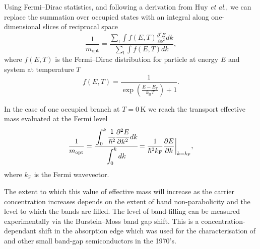 Using Fermi--Dirac statistics, and following a derivation from Huy \textit{et al.},\autocite{Huy2011} we can replace the summation over occupied states with an integral along one-dimensional slices of reciprocal space
\begin{equation} \label{opt2}
\frac{1}{m_{\text{opt}}} = \frac{\displaystyle\sum_{\text{l}} \displaystyle\int f(E,T) \frac{\partial^2 E}{\partial k^2} dk}{\displaystyle\sum_{\text{l}} \displaystyle\int f(E,T) dk},
\end{equation}
where $f(E,T)$ is the Fermi--Dirac distribution for particle at energy $E$ and system at temperature $T$
\begin{equation} \label{fermidirac}
f(E,T) = \frac{1}{\exp\left(\frac{E-E_{\text{F}}}{k_{\text{B}}T}\right)+1}.
\end{equation}

In the case of one occupied branch at $T=0\,\mathrm{K}$ we reach the transport effective mass evaluated at the Fermi level
\begin{equation} \label{opt}   
\frac{1}{m_{\text{opt}}} = \cfrac{\displaystyle\int_0^{k} \cfrac{1}{\hbar^2}\frac{\partial^2E}{\partial k^2} dk}{\displaystyle\int_0^{k}dk} = \frac{1}{\hbar^2k_{\text{F}}} \frac{\partial E}{\partial k}\biggr\rvert_{k=k_{\text{F}}},
\end{equation}
where $k_{\text{F}}$ is the Fermi wavevector.

The extent to which this value of effective mass will increase as the carrier concentration increases depends on the extent of band non-parabolicity and the level to which the bands are filled. 
The level of band-filling can be measured experimentally via the Burstein--Moss band gap shift.\autocite{Burstein1954,Moss1954} 
This is a concentration-dependant shift in the absorption edge which was used for the characterisation of  and other small band-gap semiconductors in the 1970's. 

